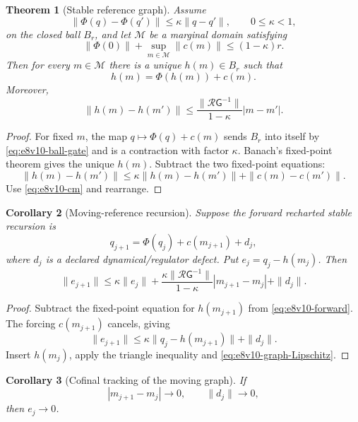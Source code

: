 \documentclass[11pt,oneside]{book}
\newtheorem{theorem}{Theorem}[chapter]
\newtheorem{corollary}[theorem]{Corollary}
\theoremstyle{definition}
\theoremstyle{remark}
\begin{document}
\begin{theorem}[Stable reference graph]
\label{thm:e8v10-reference-graph}
Assume
\[
 \|\Phi(q)-\Phi(q')\|\le\kappa\|q-q'\|,
 \qquad0\le\kappa<1,                                \label{eq:e8v10-Phi-contract}
\]
on the closed ball \(B_r\), and let \({\mathcal M}\) be a marginal
domain satisfying
\[
 \|\Phi(0)\|+\sup_{m\in{\mathcal M}}\|c(m)\|
 \le(1-\kappa)r.                                    \label{eq:e8v10-ball-gate}
\]
Then for every \(m\in{\mathcal M}\) there is a unique
\(h(m)\in B_r\) such that
\[
 h(m)=\Phi(h(m))+c(m).                              \label{eq:e8v10-graph}
\]
Moreover,
\[
 \|h(m)-h(m')\|
 \le
 \frac{\|{\mathscr R}{\mathsf G}^{-1}\|}{1-\kappa}
 |m-m'|.                                            \label{eq:e8v10-graph-Lipschitz}
\]
\end{theorem}

\begin{proof}
For fixed \(m\), the map \(q\mapsto\Phi(q)+c(m)\) sends \(B_r\) into
itself by \eqref{eq:e8v10-ball-gate} and is a contraction with factor
\(\kappa\).  Banach's fixed-point theorem gives the unique \(h(m)\).
Subtract the two fixed-point equations:
\[
 \|h(m)-h(m')\|
 \le\kappa\|h(m)-h(m')\|+\|c(m)-c(m')\|.
\]
Use \eqref{eq:e8v10-cm} and rearrange.
\end{proof}

\begin{corollary}[Moving-reference recursion]
\label{cor:e8v10-moving}
Suppose the forward recharted stable recursion is
\[
 q_{j+1}=\Phi(q_j)+c(m_{j+1})+d_j,                  \label{eq:e8v10-forward}
\]
where \(d_j\) is a declared dynamical/regulator defect.  Put
\(e_j=q_j-h(m_j)\).  Then
\[
 \|e_{j+1}\|
 \le\kappa\|e_j\|
 +\frac{\kappa\|{\mathscr R}{\mathsf G}^{-1}\|}
             {1-\kappa}|m_{j+1}-m_j|
 +\|d_j\|.                                          \label{eq:e8v10-moving-recursion}
\]
\end{corollary}

\begin{proof}
Subtract the fixed-point equation for \(h(m_{j+1})\) from
\eqref{eq:e8v10-forward}.  The forcing \(c(m_{j+1})\) cancels, giving
\[
 \|e_{j+1}\|
 \le\kappa\|q_j-h(m_{j+1})\|+\|d_j\|.
\]
Insert \(h(m_j)\), apply the triangle inequality and
\eqref{eq:e8v10-graph-Lipschitz}.
\end{proof}

\begin{corollary}[Cofinal tracking of the moving graph]
\label{cor:e8v10-tracking}
If
\[
 |m_{j+1}-m_j|\longrightarrow0,\qquad
 \|d_j\|\longrightarrow0,                           \label{eq:e8v10-forcing-zero}
\]
then \(e_j\to0\).
\end{corollary}
\end{document}
